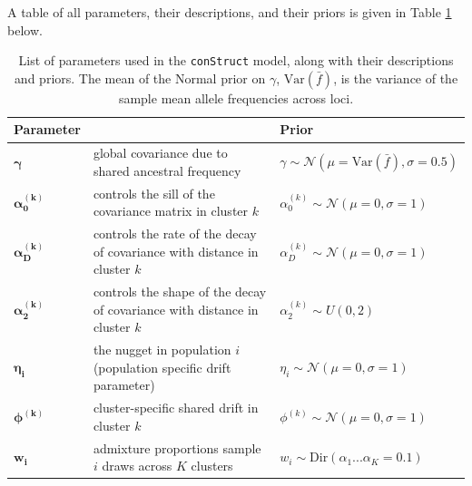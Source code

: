 \documentclass[12pt]{article}
\begin{document}
A table of all parameters, their descriptions, and their priors is given in Table \ref{tab:param_prior_tab} below.

\begin{centering}
\begin{table}
\begin{tabular}{| >{\centering\arraybackslash}m{2.1cm} | m{5.2cm} | >{\centering\arraybackslash}m{5.1cm} |}
	\hline
	\textbf{Parameter} & \centering{\textbf{Description}} & \textbf{Prior}\\ \hline
	$\boldsymbol{\gamma}$ & 
		global covariance due to shared ancestral frequency & 
		$\gamma \sim \mathcal{N}(\mu = \text{Var}(\bar{f}), \sigma = 0.5)$\\ \hline
	$\boldsymbol{\alpha^{(k)}_0}$ & 
		controls the sill of the covariance matrix in cluster $k$& 
		$\alpha^{(k)}_0 \sim \mathcal{N}(\mu = 0, \sigma = 1)$\\ \hline
	$\boldsymbol{\alpha^{(k)}_D}$ & 
		controls the rate of the decay of covariance with distance in cluster $k$& 
		$\alpha^{(k)}_D \sim \mathcal{N}(\mu = 0, \sigma = 1)$\\ \hline
	$\boldsymbol{\alpha^{(k)}_2}$ & 
		controls the shape of the decay of covariance with distance in cluster $k$ & 
		$\alpha^{(k)}_2 \sim U(0,2)$\\ \hline
	$\boldsymbol{\eta_i}$ & 
		the nugget in population $i$ (population specific drift parameter)  & 
		$\eta_i \sim \mathcal{N}(\mu = 0, \sigma = 1)$\\ \hline
	$\boldsymbol{\phi^{(k)}}$ & 
		cluster-specific shared drift in cluster $k$ &
		 $\phi^{(k)} \sim \mathcal{N}(\mu = 0, \sigma = 1)$\\ \hline
	$\boldsymbol{w_i}$ &
		admixture proportions sample $i$ draws across $K$ clusters &
		$w_i \sim \text{Dir}(\alpha_{1} ... \alpha_{K}=0.1)$  \\ \hline
	\hline
\end{tabular}
\caption{
List of parameters used in the \texttt{conStruct} model, along with their descriptions and priors.
The mean of the Normal prior on $\gamma$, $\text{Var}(\bar{f})$, is the variance of the sample mean allele frequencies across loci.
}\label{tab:param_prior_tab}
\end{table}
\end{centering}

\newpage
\end{document}

